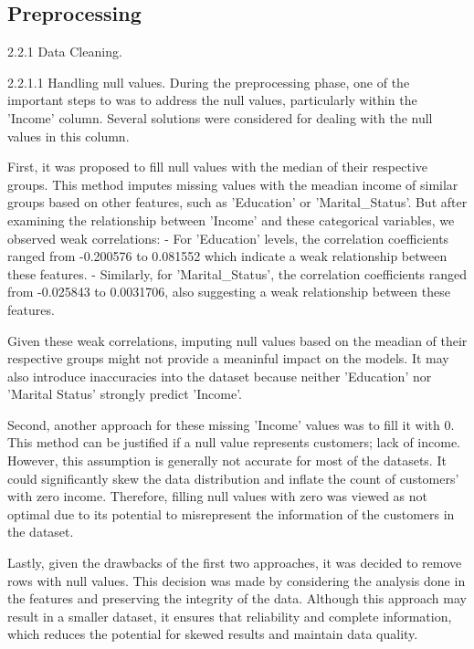 \subsection{Preprocessing}

2.2.1 Data Cleaning. 

    2.2.1.1 Handling null values. During the preprocessing phase, one of the important steps to was to address the null values, particularly within the 'Income' column. Several solutions were considered for dealing with the null values in this column. 

    First, it was proposed to fill null values with the median of their respective groups. This method imputes missing values with the meadian income of similar groups based on other features, such as 'Education' or 'Marital_Status'. But after examining the relationship between 'Income' and these categorical variables, we observed weak correlations:
        - For 'Education' levels, the correlation coefficients ranged from -0.200576 to 0.081552 which indicate a weak relationship between these features.
        - Similarly, for 'Marital_Status', the correlation coefficients ranged from -0.025843 to 0.0031706, also suggesting a weak relationship between these features.

    Given these weak correlations, imputing null values based on the meadian of their respective groups might not provide a meaninful impact on the models. It may also introduce inaccuracies into the dataset because neither 'Education' nor 'Marital Status' strongly predict 'Income'.

    Second, another approach for these missing 'Income' values was to fill it with 0. This method can be justified if a null value represents customers; lack of income. However, this assumption is generally not accurate for most of the datasets. It could significantly skew the data distribution and inflate the count of customers' with zero income. Therefore, filling null values with zero was viewed as not optimal due to its potential to misrepresent the information of the customers in the dataset.

    Lastly, given the drawbacks of the first two approaches, it was decided to remove rows with null values. This decision was made by considering the analysis done in the features and preserving the integrity of the data. Although this approach may result in a smaller dataset, it ensures that reliability and complete information, which reduces the potential for skewed results and maintain data quality.

